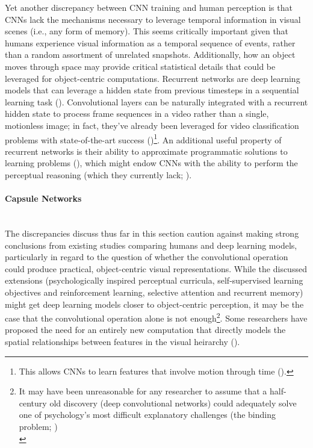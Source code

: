 \documentclass[12pt]{article}
\let\oldcite=\cite
\renewcommand{\cite}[1]{\textcolor[rgb]{0, .121, .388}{\oldcite{#1}}}
\begin{document}
Yet another discrepancy between CNN training and human perception is that CNNs lack the mechanisms necessary to leverage temporal information in visual scenes (i.e., any form of memory). This seems critically important given that humans experience visual information as a temporal sequence of events, rather than a random assortment of unrelated snapshots. Additionally, how an object moves through space may provide critical statistical details that could be leveraged for object-centric computations. Recurrent networks are deep learning models that can leverage a hidden state from previous timesteps in a sequential learning task (\cite{schmidhuber2015deepSchol}). Convolutional layers can be naturally integrated with a recurrent hidden state to process frame sequences in a video rather than a single, motionless image; in fact, they've already been leveraged for video classification problems with state-of-the-art success (\cite{yue2015beyond,xu2016recurrent})\footnote{This allows CNNs to learn features that involve motion through time (\cite{xu2016recurrent}).}. An additional useful property of recurrent networks is their ability to approximate programmatic solutions to learning problems (\cite{schmidhuber2015deepSchol}), which might endow CNNs with the ability to perform the perceptual reasoning (which they currently lack; \cite{gulccehre2016knowledge,fleuret2011comparing}).

\paragraph{Capsule Networks}\mbox{} \\

The discrepancies discuss thus far in this section caution against making strong conclusions from existing studies comparing humans and deep learning models, particularly in regard to the question of whether the convolutional operation could produce practical, object-centric visual representations. While the discussed extensions (psychologically inspired perceptual curricula, self-supervised learning objectives and reinforcement learning, selective attention and recurrent memory) might get deep learning models closer to object-centric perception, it may be the case that the convolutional operation alone is not enough\footnote{It may have been unreasonable for any researcher to assume that a half-century old discovery (deep convolutional networks) could adequately solve one of psychology's most difficult explanatory challenges (the binding problem; \cite{roskies1999binding}) \\}. Some researchers have proposed the need for an entirely new computation that directly models the spatial relationships between features in the visual heirarchy (\cite{hinton2011transforming,sabour2017dynamic}).
\end{document}
